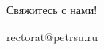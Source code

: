 \begin{frame}[plain] 
	\begin{center}
		{\Huge Свяжитесь с нами!}
		
		\bigskip\bigskip 
		
		{\LARGE rectorat@petrsu.ru}
	\end{center}
\end{frame}
